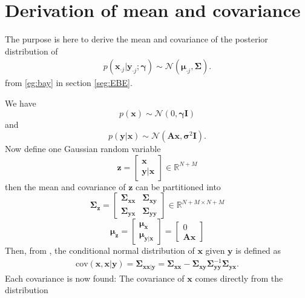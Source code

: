 \section{Derivation of mean and covariance}
The purpose is here to derive the mean and covariance of the posterior distribution of 
\begin{align*}
p\left( \textbf{x}_{\cdot j} \vert \textbf{y}_{\cdot j}; \boldsymbol{\gamma}\right) \sim \mathcal{N}(\boldsymbol{\mu} _{\cdot j},\boldsymbol{\Sigma}).
\end{align*}
from \eqref{eg:bay} in section \ref{seg:EBE}. 

We have 
$$
p(\textbf{x}) \sim \mathcal{N}(0,\boldsymbol{\gamma} \textbf{I} )
$$
and 
$$
p(\textbf{y}\vert \textbf{x}) \sim \mathcal{N}(\textbf{A}\textbf{x}, \boldsymbol{\sigma}^2\textbf{I}).
$$ 
Now define one Gaussian random variable  
$$
\textbf{z} = \begin{bmatrix}
\textbf{x} \\ 
\textbf{y}\vert \textbf{x} 
\end{bmatrix} \in \mathbb{R}^{N+M}	
$$   
then the mean and covariance of $\textbf{z}$ can be partitioned into 
$$
\boldsymbol{\Sigma}_{\textbf{z}} = \begin{bmatrix}
\boldsymbol{\Sigma}_{\textbf{x}\textbf{x}} & \boldsymbol{\Sigma}_{\textbf{x}\textbf{y}} \\ 
\boldsymbol{\Sigma}_{\textbf{y}\textbf{x}} & \boldsymbol{\Sigma}_{\textbf{y}\textbf{y}}
\end{bmatrix} \in \mathbb{R}^{N+M \times N+M}
$$
$$
\boldsymbol{\mu}_{\textbf{z}}  = \begin{bmatrix}
\boldsymbol{\mu}_{\textbf{x}}  \\ 
 \boldsymbol{\mu}_{\textbf{y}\vert \textbf{x}}
\end{bmatrix} = 
 \begin{bmatrix}
0  \\ 
\textbf{A}\textbf{x}
\end{bmatrix}
$$
Then, from \cite{conditional_cov}, the conditional normal distribution of $\textbf{x}$ given $\textbf{y}$ is defined as
\begin{align*}
\text{cov}(\textbf{x},\textbf{x}\vert \textbf{y}) = \boldsymbol{\Sigma}_{\textbf{xx}\vert\textbf{y}} = \boldsymbol{\Sigma}_{\textbf{xx}} - \boldsymbol{\Sigma}_{\textbf{xy}}\boldsymbol{\Sigma}_{\textbf{yy}}^{-1}\boldsymbol{\Sigma}_{\textbf{yx}}.
\end{align*}
Each covariance is now found:
The covariance of $\textbf{x}$ comes directly from the distribution  
